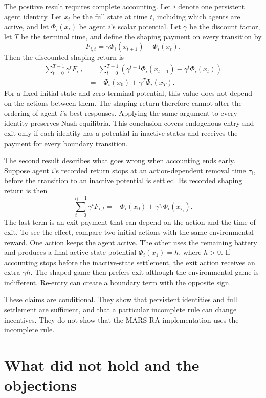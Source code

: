 \documentclass{article}
\begin{document}
The positive result requires complete accounting.  Let \(i\) denote one persistent agent identity.  Let \(x_t\) be the full state at time \(t\), including which agents are active, and let \(\Phi_i(x_t)\) be agent \(i\)'s scalar potential.  Let \(\gamma\) be the discount factor, let \(T\) be the terminal time, and define the shaping payment on every transition by
\[
F_{i,t}=\gamma\Phi_i(x_{t+1})-\Phi_i(x_t).
\]
Then the discounted shaping return is
\begin{align*}
\sum_{t=0}^{T-1}\gamma^t F_{i,t}
&=\sum_{t=0}^{T-1}\left(\gamma^{t+1}\Phi_i(x_{t+1})-\gamma^t\Phi_i(x_t)\right)\\
&=-\Phi_i(x_0)+\gamma^T\Phi_i(x_T).
\end{align*}
For a fixed initial state and zero terminal potential, this value does not depend on the actions between them.  The shaping return therefore cannot alter the ordering of agent \(i\)'s best responses.  Applying the same argument to every identity preserves Nash equilibria.  This conclusion covers endogenous entry and exit only if each identity has a potential in inactive states and receives the payment for every boundary transition.

The second result describes what goes wrong when accounting ends early.  Suppose agent \(i\)'s recorded return stops at an action-dependent removal time \(\tau_i\), before the transition to an inactive potential is settled.  Its recorded shaping return is then
\[
\sum_{t=0}^{\tau_i-1}\gamma^t F_{i,t}
=-\Phi_i(x_0)+\gamma^{\tau_i}\Phi_i(x_{\tau_i}).
\]
The last term is an exit payment that can depend on the action and the time of exit.  To see the effect, compare two initial actions with the same environmental reward.  One action keeps the agent active.  The other uses the remaining battery and produces a final active-state potential \(\Phi_i(x_1)=h\), where \(h>0\).  If accounting stops before the inactive-state settlement, the exit action receives an extra \(\gamma h\).  The shaped game then prefers exit although the environmental game is indifferent.  Re-entry can create a boundary term with the opposite sign.

These claims are conditional.  They show that persistent identities and full settlement are sufficient, and that a particular incomplete rule can change incentives.  They do not show that the MARS-RA implementation uses the incomplete rule.

\section{What did not hold and the objections}
\end{document}
